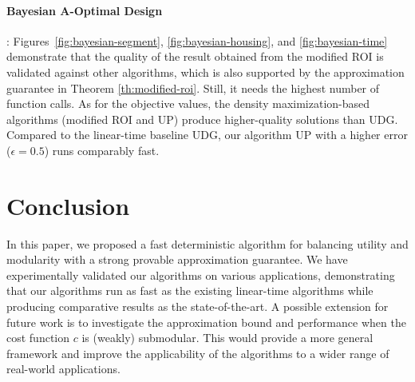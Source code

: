\documentclass[10pt]{article} %
\theoremstyle{remark}
\begin{document}
\paragraph{\bf Bayesian A-Optimal Design}:  Figures~\ref{fig:bayesian-segment}, \ref{fig:bayesian-housing}, and \ref{fig:bayesian-time} demonstrate that  
the quality of the result obtained from the modified ROI is validated against other algorithms, which is also supported by the approximation guarantee in Theorem \ref{th:modified-roi}.  Still, it needs the highest number of function calls. As for the objective values, the density maximization-based algorithms (modified ROI and UP) produce higher-quality solutions than UDG. Compared to the linear-time baseline UDG, our algorithm UP with a higher error ($\epsilon=0.5$) runs comparably fast. 


\section{Conclusion}
\label{sec:conclusion}

In this paper, we proposed a fast deterministic algorithm for balancing utility and modularity with a strong provable approximation guarantee.
We have experimentally validated our algorithms on various applications, demonstrating that our algorithms run as fast as the existing linear-time algorithms while producing comparative results as the state-of-the-art. A possible extension for future work is to investigate the approximation bound and performance when the cost function $c$ is (weakly) submodular. This would provide a more general framework and improve the applicability of the algorithms to a wider range of real-world applications.

\appendix
\end{document}
